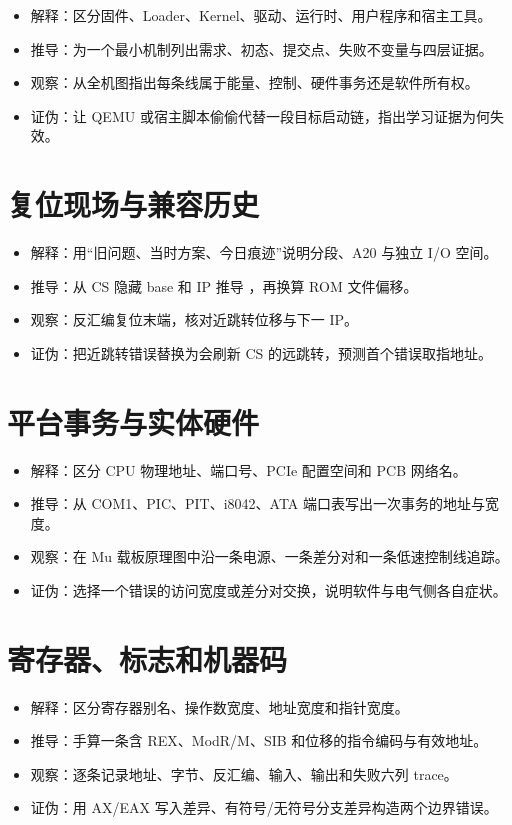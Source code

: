 \begin{itemize}
  \item 解释：区分固件、Loader、Kernel、驱动、运行时、用户程序和宿主工具。
  \item 推导：为一个最小机制列出需求、初态、提交点、失败不变量与四层证据。
  \item 观察：从全机图指出每条线属于能量、控制、硬件事务还是软件所有权。
  \item 证伪：让 QEMU 或宿主脚本偷偷代替一段目标启动链，指出学习证据为何失效。
\end{itemize}

\section*{复位现场与兼容历史}

\begin{itemize}
  \item 解释：用“旧问题、当时方案、今日痕迹”说明分段、A20 与独立 I/O 空间。
  \item 推导：从 CS 隐藏 base 和 IP 推导 ，再换算 ROM 文件偏移。
  \item 观察：反汇编复位末端，核对近跳转位移与下一 IP。
  \item 证伪：把近跳转错误替换为会刷新 CS 的远跳转，预测首个错误取指地址。
\end{itemize}

\section*{平台事务与实体硬件}

\begin{itemize}
  \item 解释：区分 CPU 物理地址、端口号、PCIe 配置空间和 PCB 网络名。
  \item 推导：从 COM1、PIC、PIT、i8042、ATA 端口表写出一次事务的地址与宽度。
  \item 观察：在 Mu 载板原理图中沿一条电源、一条差分对和一条低速控制线追踪。
  \item 证伪：选择一个错误的访问宽度或差分对交换，说明软件与电气侧各自症状。
\end{itemize}

\section*{寄存器、标志和机器码}

\begin{itemize}
  \item 解释：区分寄存器别名、操作数宽度、地址宽度和指针宽度。
  \item 推导：手算一条含 REX、ModR/M、SIB 和位移的指令编码与有效地址。
  \item 观察：逐条记录地址、字节、反汇编、输入、输出和失败六列 trace。
  \item 证伪：用 AX/EAX 写入差异、有符号/无符号分支差异构造两个边界错误。
\end{itemize}

